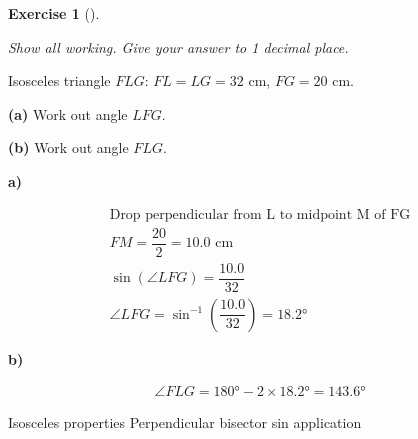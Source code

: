\documentclass[
  letterpaper,
  DIV=11,
  numbers=noendperiod]{scrreprt}
\theoremstyle{definition}
\newtheorem{exercise}{Exercise}[chapter]
\theoremstyle{remark}
\begin{document}
\begin{exercise}[]\protect\hypertarget{exr-trig-28}{}\label{exr-trig-28}

\emph{Show all working. Give your answer to 1 decimal place.}

Isosceles triangle \(FLG\): \(FL = LG = 32\) cm, \(FG = 20\) cm.

\textbf{(a)} Work out angle \(LFG\).

\textbf{(b)} Work out angle \(FLG\).

\begin{tcolorbox}[enhanced jigsaw, opacitybacktitle=0.6, coltitle=black, arc=.35mm, colframe=quarto-callout-tip-color-frame, colback=white, bottomrule=.15mm, left=2mm, colbacktitle=quarto-callout-tip-color!10!white, titlerule=0mm, opacityback=0, title=\textcolor{quarto-callout-tip-color}{\faLightbulb}\hspace{0.5em}{🔍 View Solution}, leftrule=.75mm, breakable, rightrule=.15mm, bottomtitle=1mm, toptitle=1mm, toprule=.15mm]

\textbf{a)}

\[
\begin{aligned}
\text{Drop perpendicular from L to midpoint M of FG} \\ FM = \dfrac{20}{2} = 10.0 \text{ cm} \\ \sin(\angle LFG) = \dfrac{10.0}{32} \\ \angle LFG = \sin^{-1}\!\left(\dfrac{10.0}{32}\right) = 18.2°
\end{aligned}
\]

\textbf{b)}

\[
\begin{aligned}
\angle FLG = 180° - 2 \times 18.2° = 143.6°
\end{aligned}
\]

\end{tcolorbox}

{Isosceles properties} {Perpendicular bisector} {sin application}

\end{exercise}
\end{document}
